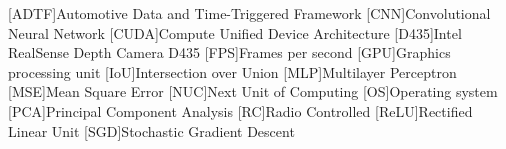 \begin{acronym}[]
    [ADTF]{Automotive Data and Time-Triggered Framework}
    [CNN]{Convolutional Neural Network}
    [CUDA]{Compute Unified Device Architecture}
    [D435]{Intel\textsuperscript{\textcopyright{}} RealSense\texttrademark{} Depth Camera D435}
    [FPS]{Frames per second}
    [GPU]{Graphics processing unit}
    [IoU]{Intersection over Union}
    [MLP]{Multilayer Perceptron}
    [MSE]{Mean Square Error}
    [NUC]{Next Unit of Computing}
    [OS]{Operating system}
    [PCA]{Principal Component Analysis}
    [RC]{Radio Controlled}
    [ReLU]{Rectified Linear Unit}
    [SGD]{Stochastic Gradient Descent}
\end{acronym}
